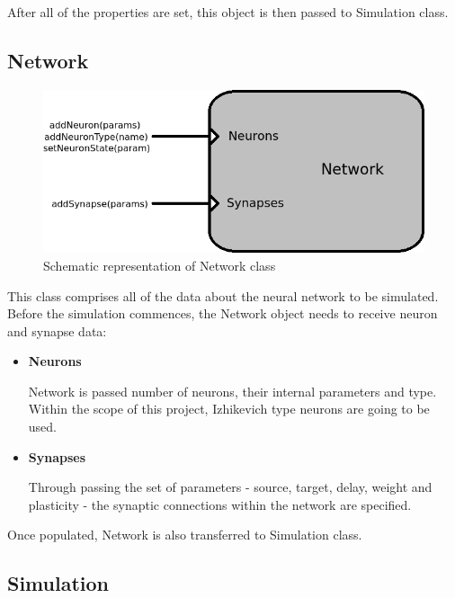 After all of the properties are set, this object is then passed to Simulation class.

\subsection{Network}

\begin{figure}[h!]
\begin{center}
\includegraphics[scale = 0.7]{images/network_scheme.png}
\end{center}
\caption{Schematic representation of Network class}
\end{figure}

This class comprises all of the data about the neural network to be simulated. Before the simulation commences, the Network object needs to receive neuron and synapse data:

\begin{itemize}
\item{\textbf{Neurons}}

Network is passed number of neurons, their internal parameters and type. Within the scope of this project, Izhikevich type neurons are going to be used.

\item{\textbf{Synapses}}

Through passing the set of parameters - source, target, delay, weight and plasticity - the synaptic connections within the network are specified.
\end{itemize}

Once populated, Network is also transferred to Simulation class.

\subsection{Simulation}

